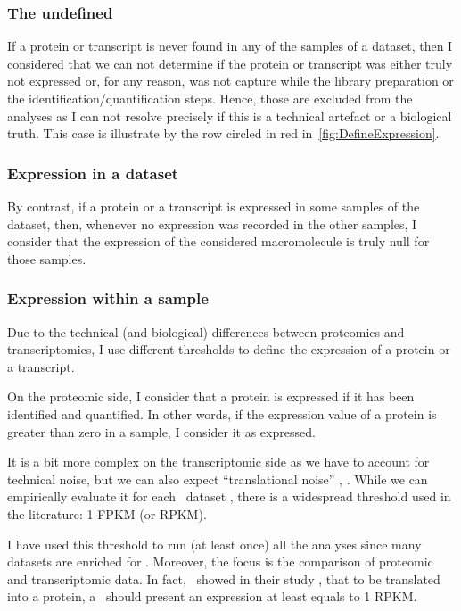\subsubsection{The undefined}%
\label{subsec:ExpressedOrNot-undefined}
If a protein or transcript is never found in any of the samples of a dataset,
then I considered that we can not determine if the protein or transcript was
either truly not expressed or, for any reason, was not capture while the library
preparation or the identification/quantification steps. Hence, those are
excluded from the analyses as I can not resolve precisely if this is a
technical artefact or a biological truth. This case is illustrate by the row
circled in red in~\cref{fig:DefineExpression}.

\subsubsection{Expression in a dataset}
\label{subsec:ExpressedOrNot--expDataset}
By contrast, if a protein or a transcript is expressed in some samples of the
dataset, then, whenever no expression was recorded in the other
samples, I consider that the expression of the considered macromolecule is truly
null for those samples.

\subsubsection{Expression within a sample}
Due to the technical (and biological) differences between proteomics and
transcriptomics, I use different thresholds to define the expression of a protein
or a transcript.

On the proteomic side, I consider that a protein is expressed if it has been
identified and quantified. In other words, if the expression value of a protein
is greater than zero in a sample, I consider it as expressed.

\label{subsubsec:exprTrans}
It is a bit more complex on the transcriptomic side as we have to account for
technical noise, but we can also expect ``translational noise'' \citep{rnaseq-2009},
\citep{lowNoiseLimit}.
While we can empirically evaluate it for each \Rnaseq\ dataset \citep{ramskoldan:2009},
there is a widespread threshold used in the literature:
1 \gls{FPKM} (or \gls{RPKM}).

I have used this threshold to run (at least once) all the analyses since
many datasets are enriched for \mRNAs. Moreover, the 
focus is the comparison of proteomic and
transcriptomic data. In fact,~\citet{Hebenstreit:2011} showed in their study
, that to be translated into a protein,
a \mRNA\ should present an expression at least equals to 1 \gls{RPKM}.

